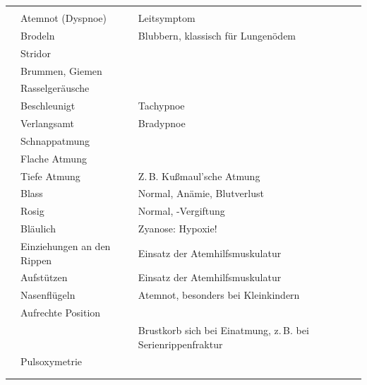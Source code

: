 \begin{tabulary}{\linewidth}[H]{LLLL}
\toprule\addlinespace
\noindent{}
 &
\noindent{}
 &
\noindent{}
 &
\\\addlinespace\midrule\addlinespace
\noindent{}
 &
Atemnot (Dyspnoe) 
 &
Leitsymptom
 &
\\\addlinespace
\noindent{}
 &
Brodeln 
 &
Blubbern, klassisch für Lungenödem
 &
\\\addlinespace
 &
Stridor 
 &
 &
\\\addlinespace
 &
Brummen, Giemen
& &
\\\addlinespace
 &
Rasselgeräusche 
 &
 &
\\\addlinespace
\noindent{}
 &
Beschleunigt
 &
Tachypnoe 
 &
\\\addlinespace
 &
Verlangsamt
 &
Bradypnoe 
 &
\\\addlinespace
\noindent{}
 &
Schnappatmung
 &
 &
\\\addlinespace
 &
Flache Atmung
 &
 &
\\\addlinespace
 &
Tiefe Atmung
 &
Z.\,B. Kußmaul'sche Atmung
 &
\\\addlinespace
\noindent{}
 &
Blass
 &
Normal, Anämie, Blutverlust
 &
\\\addlinespace
 &
Rosig
 &
Normal, -Vergiftung
 &
\\\addlinespace
 &
Bläulich 
 &
Zyanose: Hypoxie!
 &
\\\addlinespace
\noindent{}
 &
Einziehungen an den Rippen
&
Einsatz der Atemhilfsmuskulatur
&
\\\addlinespace
&
Aufstützen
&
Einsatz der Atemhilfsmuskulatur
&
\\\addlinespace
&
Nasenflügeln 
&
Atemnot, besonders bei Kleinkindern
&
\\\addlinespace
&
Aufrechte Position
&
&
\\\addlinespace
&
&
Brustkorb  sich bei Einatmung, z.\,B. bei
Serienrippenfraktur 
&
\\\addlinespace
\noindent{}
&
Pulsoxymetrie
&
&
\\\addlinespace
&
&
\\\addlinespace\bottomrule
\end{tabulary}